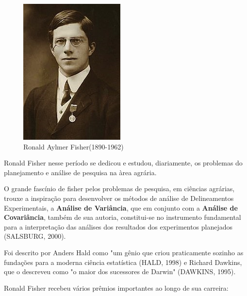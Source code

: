 \begin{figure}
    \centering
\includegraphics[scale=0.5]{figures/fisher.jpeg}
    \caption{Ronald Aylmer Fisher(1890-1962)}
    \label{fig:my_label3}
\end{figure}


Ronald Fisher nesse período se dedicou e estudou, diariamente, os problemas do planejamento e análise de pesquisa na àrea agrária. \vskip0.3cm


O grande fascínio de fisher pelos problemas de pesquisa, em ciências agrárias, trouxe a inspiração para desenvolver os métodos de análise de Delineamentos Experimentais, a \textbf{Análise de Variância}, que em conjunto com a \textbf{Análise de Covariância}, também de sua autoria, constitui-se no instrumento fundamental para a interpretação das análises dos resultados dos experimentos planejados (SALSBURG, 2000). \vskip0.3cm




Foi descrito por Anders Hald como "um gênio que criou praticamente sozinho as fundações para a moderna ciência estatística (HALD, 1998) e Richard Dawkins, que o descreveu como "o maior dos sucessores de Darwin" (DAWKINS, 1995).\vskip0.3cm


\newpage
Ronald Fisher recebeu vários prêmios importantes ao longo de sua carreira:

